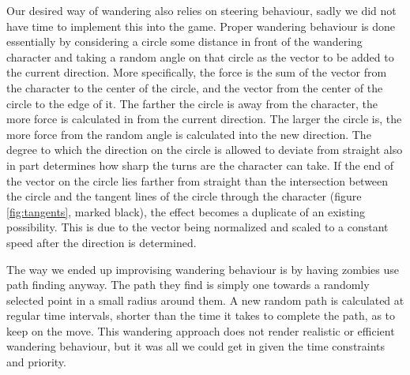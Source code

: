 Our desired way of wandering also relies on steering behaviour, sadly we did not have time to implement this into the game. Proper wandering behaviour is done essentially by considering a circle some distance in front of the wandering character and taking a random angle on that circle as the vector to be added to the current direction. More specifically, the force is the sum of the vector from the character to the center of the circle, and the vector from the center of the circle to the edge of it. The farther the circle is away from the character, the more force is calculated in from the current direction. The larger the circle is, the more force from the random angle is calculated into the new direction. The degree to which the direction on the circle is allowed to deviate from straight also in part determines how sharp the turns are the character can take. If the end of the vector on the circle lies farther from straight than the intersection between the circle and the tangent lines of the circle through the character (figure \ref{fig:tangents}, marked black), the effect becomes a duplicate of an existing possibility. This is due to the vector being normalized and scaled to a constant speed after the direction is determined.

The way we ended up improvising wandering behaviour is by having zombies use path finding anyway. The path they find is simply one towards a randomly selected point in a small radius around them. A new random path is calculated at regular time intervals, shorter than the time it takes to complete the path, as to keep on the move. This wandering approach does not render realistic or efficient wandering behaviour, but it was all we could get in given the time constraints and priority.
